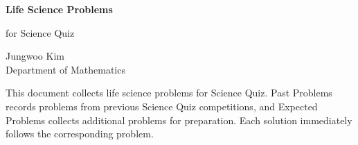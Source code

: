 \documentclass[11pt,oneside]{article}
\begin{document}
    \thispagestyle{empty}

    \begin{center}
        \vspace*{1.1cm}

        {\LARGE\bfseries Life Science Problems\par}

        \vspace{0.25cm}

        {\large for Science Quiz\par}

        \vspace{0.75cm}

        {\normalsize
        Jungwoo Kim\\
        Department of Mathematics\\
        \PohangUniversityOfScienceAndTechnology
        \par}

    \end{center}

    \vspace{0.45cm}

    This document collects life science problems for Science Quiz. Past Problems
    records problems from previous Science Quiz competitions, and Expected
    Problems collects additional problems for preparation. Each solution
    immediately follows the corresponding problem.

    \vspace{0.45cm}

    \tableofcontents

    
    
\end{document}
